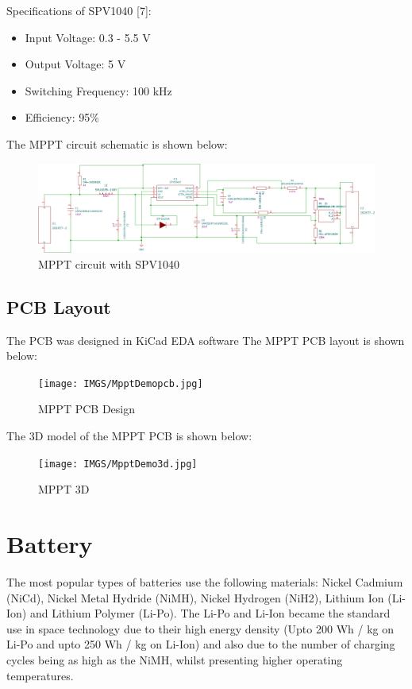 Specifications of  SPV1040 [7]:
	\begin{itemize}
	\item Input Voltage: 0.3 - 5.5 V
	\item Output Voltage: 5 V
	\item Switching Frequency: 100 kHz
	\item Efficiency: 95\%
\end{itemize}
The MPPT circuit schematic is shown below:
 	\begin{figure}[h]
	\centering
	\includegraphics[width=\columnwidth]{IMGS/MpptDemoBoard.pdf}
	\caption{MPPT circuit with SPV1040}
	\label{fig:mpptsch}
\end{figure}
\subsection{PCB Layout}
The PCB was designed in KiCad EDA software
The MPPT PCB layout is shown below:
\begin{figure}[H]
	\centering
	\texttt{[image: IMGS/MpptDemopcb.jpg]}
	\caption{MPPT PCB Design}
	\label{fig:mpptpcb}
\end{figure}

The 3D model of the MPPT PCB is shown below:
\begin{figure}[H]
	\centering
	\texttt{[image: IMGS/MpptDemo3d.jpg]}
	\caption{MPPT 3D}
	\label{fig:mppt3d}
\end{figure}





\section[Battery]{Battery}
The most popular types of batteries use the following materials: Nickel Cadmium
(NiCd), Nickel Metal Hydride (NiMH), Nickel Hydrogen (NiH2), Lithium Ion
(Li-Ion) and Lithium Polymer (Li-Po). The Li-Po and Li-Ion became the standard use in space technology due to their
high energy density (Upto 200 Wh / kg on Li-Po and upto 250 Wh / kg on Li-Ion) and also due to
the number of charging cycles being as high as the NiMH, whilst presenting higher
operating temperatures. 
